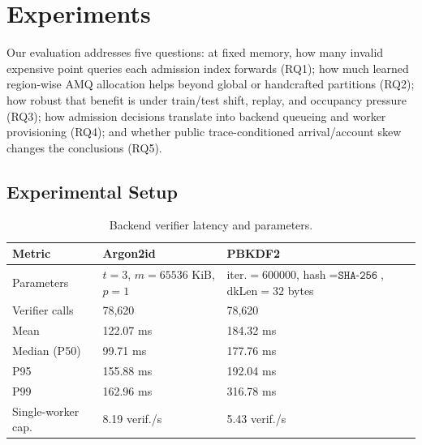 \section{Experiments}
\label{sec:experiments}

Our evaluation addresses five questions: at fixed memory, how many invalid expensive point queries each admission index forwards (RQ1); how much learned region-wise AMQ allocation helps beyond global or handcrafted partitions (RQ2); how robust that benefit is under train/test shift, replay, and occupancy pressure (RQ3); how admission decisions translate into backend queueing and worker provisioning (RQ4); and whether public trace-conditioned arrival/account skew changes the conclusions (RQ5).

\subsection{Experimental Setup}

\begin{table}[t]
  \centering
  \footnotesize
  \caption{Backend verifier latency and parameters.}
  \label{tab:backend-benchmark}
  \begin{tabularx}{\columnwidth}{lXX}
    \toprule
    Metric & Argon2id & PBKDF2 \\
    \midrule
    Parameters
      & \(t=3\), \(m=65536\) KiB, \(p=1\)
      & iter.\(=600000\), hash\(=\texttt{SHA-256}\), dkLen\(=32\) bytes \\
    Verifier calls
      & 78,620
      & 78,620 \\
    Mean
      & 122.07 ms
      & 184.32 ms \\
    Median (P50)
      & 99.71 ms
      & 177.76 ms \\
    P95
      & 155.88 ms
      & 192.04 ms \\
    P99
      & 162.96 ms
      & 316.78 ms \\
    Single-worker cap.
      & 8.19 verif./s
      & 5.43 verif./s \\
    \bottomrule
  \end{tabularx}
\end{table}

